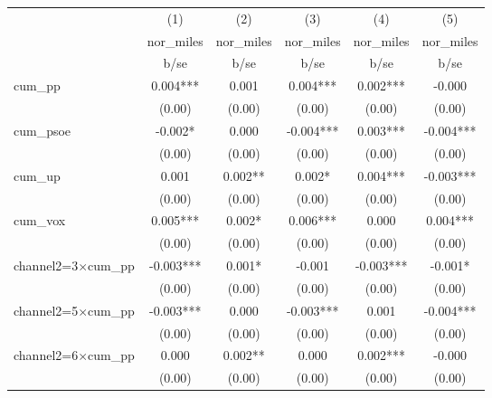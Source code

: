 \begin{tabular}{l*{5}{c}}
\toprule
                    &\multicolumn{1}{c}{(1)}&\multicolumn{1}{c}{(2)}&\multicolumn{1}{c}{(3)}&\multicolumn{1}{c}{(4)}&\multicolumn{1}{c}{(5)}\\
                    &\multicolumn{1}{c}{nor\_miles}&\multicolumn{1}{c}{nor\_miles}&\multicolumn{1}{c}{nor\_miles}&\multicolumn{1}{c}{nor\_miles}&\multicolumn{1}{c}{nor\_miles}\\
                    &        b/se   &        b/se   &        b/se   &        b/se   &        b/se   \\
\midrule
cum\_pp              &       0.004***&       0.001   &       0.004***&       0.002***&      -0.000   \\
                    &      (0.00)   &      (0.00)   &      (0.00)   &      (0.00)   &      (0.00)   \\
cum\_psoe            &      -0.002*  &       0.000   &      -0.004***&       0.003***&      -0.004***\\
                    &      (0.00)   &      (0.00)   &      (0.00)   &      (0.00)   &      (0.00)   \\
cum\_up              &       0.001   &       0.002** &       0.002*  &       0.004***&      -0.003***\\
                    &      (0.00)   &      (0.00)   &      (0.00)   &      (0.00)   &      (0.00)   \\
cum\_vox             &       0.005***&       0.002*  &       0.006***&       0.000   &       0.004***\\
                    &      (0.00)   &      (0.00)   &      (0.00)   &      (0.00)   &      (0.00)   \\
channel2=3$\times$cum\_pp&      -0.003***&       0.001*  &      -0.001   &      -0.003***&      -0.001*  \\
                    &      (0.00)   &      (0.00)   &      (0.00)   &      (0.00)   &      (0.00)   \\
channel2=5$\times$cum\_pp&      -0.003***&       0.000   &      -0.003***&       0.001   &      -0.004***\\
                    &      (0.00)   &      (0.00)   &      (0.00)   &      (0.00)   &      (0.00)   \\
channel2=6$\times$cum\_pp&       0.000   &       0.002** &       0.000   &       0.002***&      -0.000   \\
                    &      (0.00)   &      (0.00)   &      (0.00)   &      (0.00)   &      (0.00)   \\

\end{tabular}
